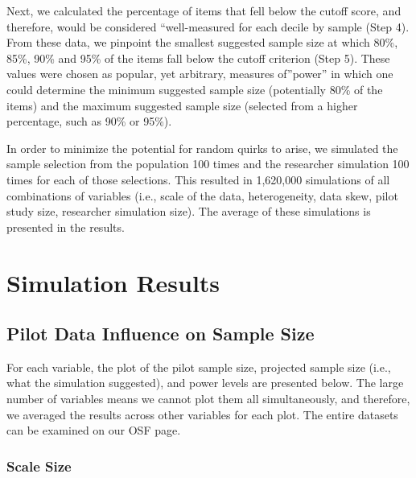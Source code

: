 \documentclass[
  man]{apa7}
\begin{document}
Next, we calculated the percentage of items that fell below the cutoff score, and therefore, would be considered ``well-measured for each decile by sample (Step 4). From these data, we pinpoint the smallest suggested sample size at which 80\%, 85\%, 90\% and 95\% of the items fall below the cutoff criterion (Step 5). These values were chosen as popular, yet arbitrary, measures of''power'' in which one could determine the minimum suggested sample size (potentially 80\% of the items) and the maximum suggested sample size (selected from a higher percentage, such as 90\% or 95\%).

In order to minimize the potential for random quirks to arise, we simulated the sample selection from the population 100 times and the researcher simulation 100 times for each of those selections. This resulted in 1,620,000 simulations of all combinations of variables (i.e., scale of the data, heterogeneity, data skew, pilot study size, researcher simulation size). The average of these simulations is presented in the results.

\section{Simulation Results}\label{simulation-results}

\subsection{Pilot Data Influence on Sample Size}\label{pilot-data-influence-on-sample-size}

For each variable, the plot of the pilot sample size, projected sample size (i.e., what the simulation suggested), and power levels are presented below. The large number of variables means we cannot plot them all simultaneously, and therefore, we averaged the results across other variables for each plot. The entire datasets can be examined on our OSF page.

\subsubsection{Scale Size}\label{scale-size}
\end{document}
